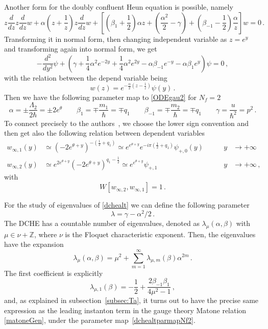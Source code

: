 \documentclass[11pt,a4paper]{elsarticle}
\def \th {\theta}
\def \L {\Lambda}
\newcommand{\be}{\begin{equation}}
\newcommand{\ee}{\end{equation}}
\def\th{\theta}
\def \L {\Lambda}
\numberwithin{figure}{section}
\numberwithin{table}{section}
\begin{document}
Another form for the doubly confluent Heun equation is possible, namely~\cite{Ronveaux:1995}
\be  \label{dchealt}
z \frac{d}{dz} z \frac{d}{dz} w+ \alpha \left(z+\frac{1}{z} \right) z \frac{d}{dz} w +\left[(\beta_1 + \frac{1}{2} ) \alpha z + \left( \frac{\alpha^2}{2} -\gamma\right)+(\beta_{-1}-\frac{1}{2}) \frac{\alpha}{z} \right] w = 0\,.
\ee
Transforming it in normal form, then changing independent variable as $z = e^y$ and transforming again into normal form, we get
\be 
-\frac{d^2}{dy^2}\psi + \left (\gamma +\frac{1}{4} \alpha ^2 e^{-2 y}+\frac{1}{4} \alpha ^2 e^{2 y}-\alpha  \beta_{-1} e^{-y}-\alpha  \beta_1 e^y \right)\psi = 0\,,
\ee
with the relation between the depend variable being
\be 
w(z) = e^{-\frac{\alpha}{2} \left(z-\frac{1}{z} \right) } \psi(y)\,.
\ee 
Then we have the following parameter map to \eqref{ODEgau2} for $N_f=2$
\be  \label{dchealtparmapNf2}
\alpha = \pm\frac{\L_2}{2 \hbar} = \pm 2 e^\th\qquad \beta_1 = \mp \frac{m_1}{\hbar}=\mp q_1 \qquad \beta_{-1} = \mp\frac{m_2}{\hbar}=\mp q_1\qquad \gamma = \frac{u}{\hbar^2} = p^2\,.
\ee 
To connect precisely to the authors~\cite{Ronveaux:1995}, we choose the lower sign convention and then get also the following relation between dependent variables
\begin{align} 
w_{\infty,1}(y) &\simeq (-2 e^{\th+y})^{-(\frac{1}{2}+q_1) } \simeq e^{e^{\th+y}}e^{-i \pi(\frac{1}{2}+q_1) }\psi_{+,0}(y) \qquad &y &\to +\infty \\
w_{\infty,2}(y)&\simeq e^{2 e^{\th+y}}(-2 e^{\th+y})^{q_1-\frac{1}{2}}\simeq e^{e^{\th+y}} \psi_{+,1}  \qquad &y &\to + \infty\,,
\end{align}
with
\be 
W[w_{\infty,2},w_{\infty,1}]=1\,.
\ee

For the study of eigenvalues of \eqref{dchealt} we can define the following parameter 
\be 
\lambda = \gamma - \alpha^2/2 \,.
\ee 
The DCHE has a countable number of eigenvalues, denoted as $\lambda_\mu(\alpha,\beta)$ with $
\mu \in \nu + \mathbb{Z}$, where $\nu$ is the Floquet characteristic exponent. Then, the eigenvalues have the expansion
\be 
\lambda_\mu(\alpha,\beta) = \mu^2 + \sum_{m=1}^\infty \lambda_{\mu,m}(\beta) \alpha^{2 m}	\,.
\ee
The first coefficient is explicitly~\cite{Ronveaux:1995}
\be \label{ExpEigenDCHE}
\lambda_{\mu ,1}(\beta) = - \frac{1}{2} + \frac{2 \beta_{-1}\beta_1}{4\mu^2-1}\,,
\ee
and, as explained in subsection~\ref{subsec:Ta}, it turns out to have the precise same expression as the leading instanton term in the gauge theory Matone relation \eqref{matoneGen}, under the parameter map~\eqref{dchealtparmapNf2}.
\end{document}
